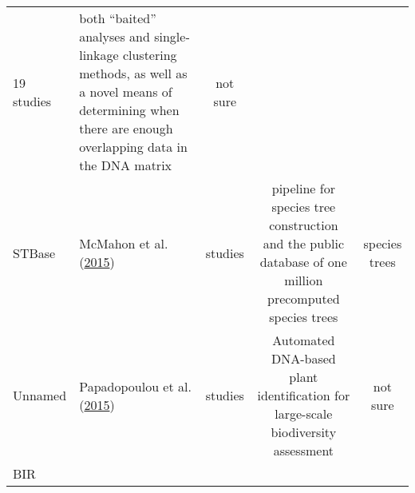 \documentclass[]{article}
\begin{document}
\begin{longtable}[]{@{}llccc@{}}
\begin{minipage}[t]{0.20\columnwidth}
19 studies\strut
\end{minipage} & \begin{minipage}[t]{0.20\columnwidth}\centering
both ``baited'' analyses and single‐linkage clustering methods, as well as a novel means of determining when there are enough overlapping data in the DNA matrix\strut
\end{minipage} & \begin{minipage}[t]{0.20\columnwidth}\centering
not sure\strut
\end{minipage}\tabularnewline
\begin{minipage}[t]{0.12\columnwidth}\raggedright
STBase\strut
\end{minipage} & \begin{minipage}[t]{0.15\columnwidth}\raggedright
McMahon et al. (\protect\hyperlink{ref-mcmahon2015stbase}{2015})\strut
\end{minipage} & \begin{minipage}[t]{0.20\columnwidth}\centering
7 studies\strut
\end{minipage} & \begin{minipage}[t]{0.20\columnwidth}\centering
pipeline for species tree construction and the public database of one million precomputed species trees\strut
\end{minipage} & \begin{minipage}[t]{0.20\columnwidth}\centering
species trees\strut
\end{minipage}\tabularnewline
\begin{minipage}[t]{0.12\columnwidth}\raggedright
Unnamed\strut
\end{minipage} & \begin{minipage}[t]{0.15\columnwidth}\raggedright
Papadopoulou et al. (\protect\hyperlink{ref-papadopoulou2015automated}{2015})\strut
\end{minipage} & \begin{minipage}[t]{0.20\columnwidth}\centering
17 studies\strut
\end{minipage} & \begin{minipage}[t]{0.20\columnwidth}\centering
Automated DNA-based plant identification for large-scale biodiversity assessment\strut
\end{minipage} & \begin{minipage}[t]{0.20\columnwidth}\centering
not sure\strut
\end{minipage}\tabularnewline
\begin{minipage}[t]{0.12\columnwidth}\raggedright
BIR\strut
\end{minipage} & \begin{minipage}[t]{0.15\columnwidth}\raggedright

\end{minipage}
\end{longtable}
\end{document}
